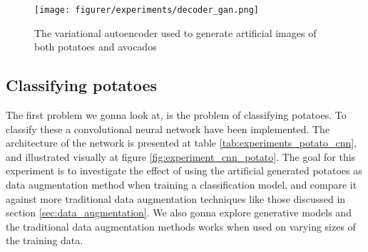 \documentclass[11pt]{article}
\begin{document}
\begin{figure}[!h]
    \centering
    \texttt{[image: figurer/experiments/decoder\_gan.png]}
    \caption{The variational autoencoder used to generate artificial images of both potatoes and avocados}
    \label{fig:experiment_gan_decoder}
\end{figure}





\subsection{Classifying potatoes}



The first problem we gonna look at, is the problem of classifying potatoes. To classify these a convolutional neural network have been implemented. The architecture of the network is presented at table \ref{tab:experiments_potato_cnn}, and illustrated visually at figure \ref{fig:experiment_cnn_potato}. The goal for this experiment is to investigate the effect of using the artificial generated potatoes as data augmentation method when training a classification model, and compare it against more traditional data augmentation techniques like those discussed in section \ref{sec:data_augmentation}. We also gonna explore generative models and the traditional data augmentation methods works when used on varying sizes of the training data. 
\\ \\
\end{document}
